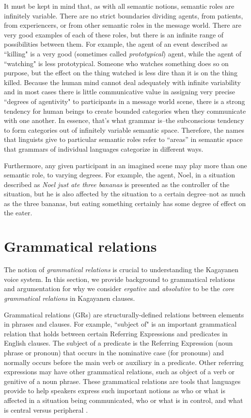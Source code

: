 It must be kept in mind that, as with all semantic notions, semantic roles are infinitely variable. There are no strict boundaries dividing agents, from patients, from experiencers, or from other semantic roles in the message world. There are very good examples of each of these roles, but there is an infinite range of possibilities between them. For example, the agent of an event described as “killing" is a very good (sometimes called \textit{prototypical}) agent, while the agent of “watching" is less prototypical. Someone who watches something does so on purpose, but the effect on the thing watched is less dire than it is on the thing killed. Because the human mind cannot deal adequately with infinite variability and in most cases there is little communicative value in assigning very precise “degrees of agentivity" to participants in a message world scene, there is a strong tendency for human beings to create bounded categories when they communicate with one another. In essence, that's what grammar is--the subconscious tendency to form categories out of infinitely variable semantic space. Therefore, the names that linguists give to particular semantic roles refer to “areas” in semantic space that grammars of individual languages categorize in different ways.

Furthermore, any given participant in an imagined scene may play more than one semantic role, to varying degrees. For example, the agent, Noel, in a situation described as \textit{Noel just ate three bananas} is presented as the controller of the situation, but he is also affected by the situation to a certain degree--not as much as the three bananas, but eating something certainly has some degree of effect on the eater.
\section{Grammatical relations}
\label{bkm:Ref482605816} \label{sec:grammaticalrelations}
The notion of \textit{grammatical relations} is crucial to understanding the Kagayanen voice system. In this section, we provide background to grammatical relations and argumentation for why we consider \textit{ergative} and \textit{absolutive} to be the \textit{core grammatical relations} in Kagayanen clauses.

Grammatical relations (GRs) are structurally-defined relations between elements in phrases and clauses. For example, ``subject of" is an important grammatical relation that holds between certain Referring Expressions and predicates in English clauses. The subject of a predicate is the Referring Expression (noun phrase or pronoun) that occurs in the nominative case (for pronouns) and normally occurs before the main verb or auxiliary in a predicate. Other referring expressions may have other grammatical relations, such as object of a verb or genitive of a noun phrase. These grammatical relations are tools that languages provide to help speakers express such important notions as who or what is affected in a situation being communicated, who or what is in control, and what is central versus peripheral \citep{comrie1989}.

